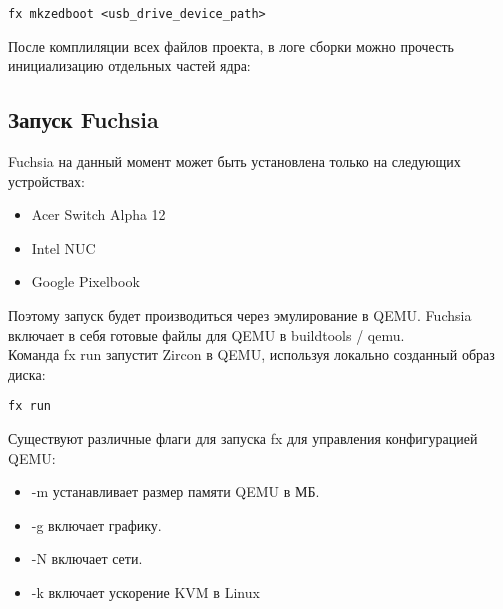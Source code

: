 \documentclass[14pt,a4paper]{article}
\begin{document}
\begin{lstlisting}
fx mkzedboot <usb_drive_device_path>
\end{lstlisting}

После комплиляции всех файлов проекта, в логе сборки можно прочесть инициализацию отдельных частей ядра:


\subsection{Запуск Fuchsia}

Fuchsia на данный момент может быть установлена только на следующих устройствах: 

\begin{itemize}
    \item Acer Switch Alpha 12
    \item Intel NUC
    \item Google Pixelbook
\end{itemize}

Поэтому запуск будет производиться через эмулирование в QEMU. Fuchsia включает в себя готовые файлы для QEMU в buildtools / qemu. \\
Команда fx run запустит Zircon в QEMU, используя локально созданный образ диска:

\begin{lstlisting}
fx run
\end{lstlisting}

Существуют различные флаги для запуска fx для управления конфигурацией QEMU:

\begin{itemize}
    \item -m устанавливает размер памяти QEMU в МБ.
    \item -g включает графику.
    \item -N включает сети.
    \item -k включает ускорение KVM в Linux
\end{itemize}
\end{document}
